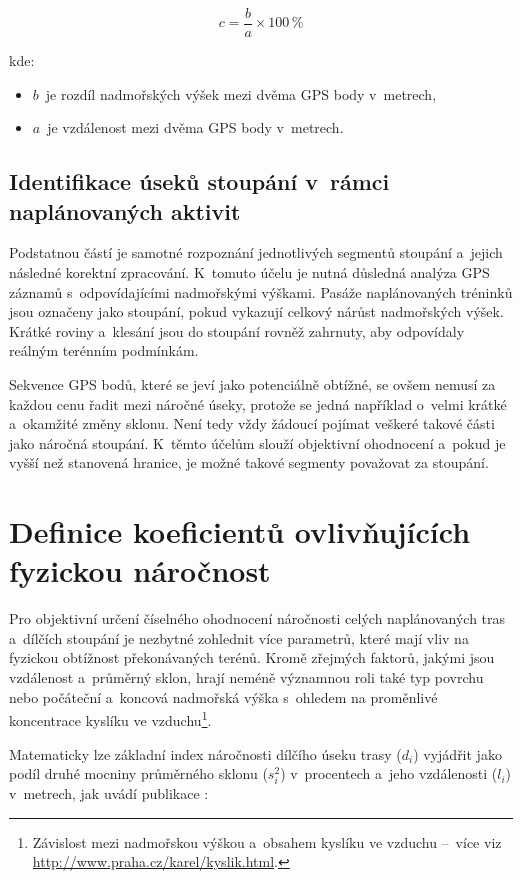 \[
    c = \frac{b}{a} \times 100\,\%
\]

kde:
\begin{itemize}
    \item $b$~je rozdíl nadmořských výšek mezi dvěma GPS body v~metrech,
    \item $a$~je vzdálenost mezi dvěma GPS body v~metrech.
\end{itemize}

\subsection{Identifikace úseků stoupání v~rámci naplánovaných aktivit}
\label{identification-of-climb-sections-within-planned-activities}

Podstatnou částí je samotné rozpoznání jednotlivých segmentů stoupání a~jejich následné korektní zpracování.
K~tomuto účelu je nutná důsledná analýza GPS záznamů s~odpovídajícími nadmořskými výškami.
Pasáže naplánovaných tréninků jsou označeny jako stoupání, pokud vykazují celkový nárůst nadmořských výšek.
Krátké roviny a~klesání jsou do stoupání rovněž zahrnuty, aby odpovídaly reálným terénním podmínkám.

Sekvence GPS bodů, které se jeví jako potenciálně obtížné, se ovšem nemusí za každou cenu řadit mezi náročné úseky, protože se jedná například o~velmi krátké a~okamžité změny sklonu.
Není tedy vždy žádoucí pojímat veškeré takové části jako náročná stoupání.
K~těmto účelům slouží objektivní ohodnocení a~pokud je vyšší než stanovená hranice, je možné takové segmenty považovat za stoupání.

\section{Definice koeficientů ovlivňujících fyzickou náročnost}
\label{definitions-of-coefficients-affecting-physical-demand}

Pro objektivní určení číselného ohodnocení náročnosti celých naplánovaných tras a~dílčích stoupání je nezbytné zohlednit více parametrů, které mají vliv na fyzickou obtížnost překonávaných terénů.
Kromě zřejmých faktorů, jakými jsou vzdálenost a~průměrný sklon, hrají neméně významnou roli také typ povrchu nebo počáteční a~koncová nadmořská výška s~ohledem na proměnlivé koncentrace kyslíku ve vzduchu\footnote{Závislost mezi nadmořskou výškou a~obsahem kyslíku ve vzduchu --~více viz \url{http://www.praha.cz/karel/kyslik.html}.}.

Matematicky lze základní index náročnosti dílčího úseku trasy ($d_i$) vyjádřit jako podíl druhé mocniny průměrného sklonu ($s_i^2$) v~procentech a~jeho vzdálenosti ($l_i$) v~metrech, jak uvádí publikace \cite{GodeLegrosJP1990}:

